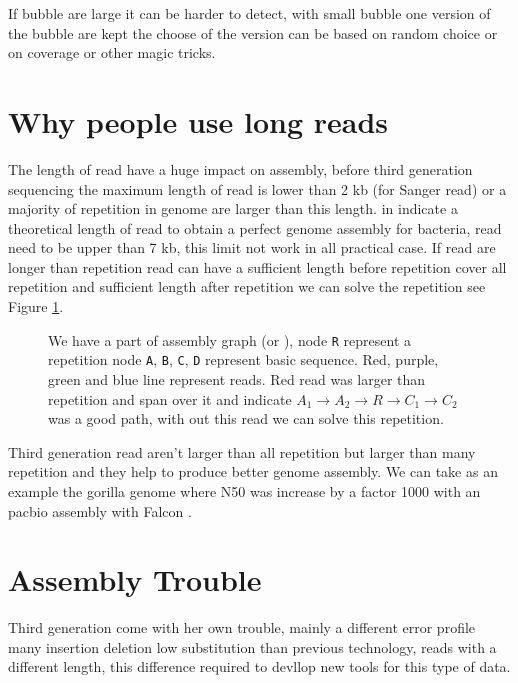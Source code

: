 \documentclass[./main.tex]{subfiles}
\begin{document}
If bubble are large it can be harder to detect, with small bubble one version of the bubble are kept the choose of the version can be based on random choice or on coverage or other magic tricks.

\section{Why people use long reads}

The length of read have a huge impact on assembly, before third generation sequencing the maximum length of read is lower than 2 kb (for Sanger read) or a majority of repetition in genome are larger than this length. \citeauthor{one_chromosome_one_contig} in \cite{one_chromosome_one_contig} indicate a theoretical length of read to obtain a perfect genome assembly for bacteria, read need to be upper than 7 kb, this limit not work in all practical case. If read are longer than repetition read can have a sufficient length before repetition cover all repetition and sufficient length after repetition we can solve the repetition see Figure \ref{intro:fig:whylongreads}.

\begin{figure}[ht]
    \centering
    
    \caption{We have a part of assembly graph (\OLC or \DBG), node \texttt{R} represent a repetition node \texttt{A}, \texttt{B}, \texttt{C}, \texttt{D} represent basic sequence. Red, purple, green and blue line represent reads. Red read was larger than repetition and span over it and indicate $A_1 \rightarrow A_2 \rightarrow R \rightarrow C_1 \rightarrow C_2$ was a good path, with out this read we can solve this repetition.}
    \label{intro:fig:whylongreads}
\end{figure}

Third generation read aren't larger than all repetition but larger than many repetition and they help to produce better genome assembly. We can take as an example the gorilla genome where N50 was increase by a factor 1000 with an pacbio assembly with Falcon \cite{gorilla_genome}.

\section{Assembly Trouble}

Third generation come with her own trouble, mainly a different error profile many insertion deletion low substitution than previous technology, reads with a different length, this difference required to devllop new tools for this type of data.
\end{document}
